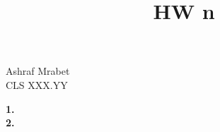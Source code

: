 \documentclass[12pt]{article}
\title{\bf\Large HW n}
\author{}
\date{}
\newcommand{\question}[1]{{\bf\Large #1.}}
\begin{document}
	\begin{flushleft}
		\small
		Ashraf Mrabet\\
		CLS XXX.YY
	\end{flushleft}
	{\let\newpage\relax\maketitle}
	
	\question{1}
	\\
	
	\question{2}
\end{document}
